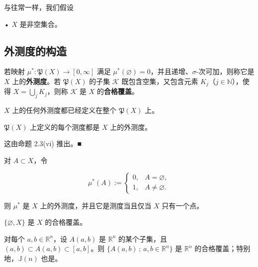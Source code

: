 与往常一样，我们假设

• $ X $ 是非空集合。

\subsection*{外测度的构造}

若映射 $ \mu^*\colon \mathfrak{P}(X) \to [0,\infty] $ 满足 $ \mu^*(\varnothing) = 0 $，并且递增、$ \sigma $-次可加，则称它是 $ X $ 上的\textbf{外测度}。若 $ \mathfrak{P}(X) $ 的子集 $ \mathcal{K} $ 既包含空集，又包含元素 $ K_j $（$ j \in \mathbb{N} $），使得 $ X = \bigcup_j K_j $，则称 $ \mathcal{K} $ 是 $ X $ 的\textbf{合格覆盖}。

\begin{remark}

\begin{items}
\item

$ X $ 上的任何外测度都已经定义在整个 $ \mathfrak{P}(X) $ 上。

\item

$ \mathfrak{P}(X) $ 上定义的每个测度都是 $ X $ 上的外测度。

\proofhead
这由命题 2.3(vi) 推出。\nobreak\hspace{0.35em}■
\item

对 $ A \subset X $，令

\begin{equation*}
\mu^*(A) := \begin{cases} 0 , & A = \varnothing , \\ 1 , & A \ne \varnothing . \end{cases}
\end{equation*}

则 $ \mu^* $ 是 $ X $ 上的外测度，并且它是测度当且仅当 $ X $ 只有一个点。

\item

$ \{ \varnothing, X \} $ 是 $ X $ 的合格覆盖。

\item

对每个 $ a, b \in \mathbb{R}^n $，设 $ A(a,b) $ 是 $ \mathbb{R}^n $ 的某个子集，且 $ (a,b) \subset A(a,b) \subset [a,b] $。则 $ \{ A(a,b) \,;\ a, b \in \mathbb{R}^n \} $ 是 $ \mathbb{R}^n $ 的合格覆盖；特别地，$ \mathbb{J}(n) $ 也是。

\item


\end{items}
\end{remark}
